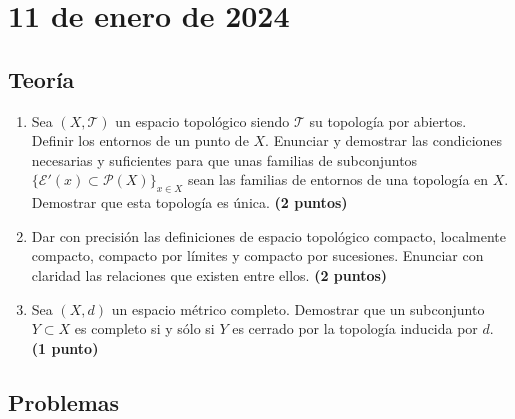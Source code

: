 \newpage

\section{11 de enero de 2024}

\subsection{Teoría}

\begin{enumerate}
    \item Sea $(X, \mathcal{T})$ un espacio topológico siendo $\mathcal{T}$ su topología por abiertos. Definir los entornos de un punto de $X$. Enunciar y demostrar las condiciones necesarias y suficientes para que unas familias de subconjuntos $\{\mathcal{E}'(x) \subset \mathcal{P}(X)\}_{x \in X}$ sean las familias de entornos de una topología en $X$. Demostrar que esta topología es única.
    \hfill \textbf{(2 puntos)}

    \item Dar con precisión las definiciones de espacio topológico compacto, localmente compacto, compacto por límites y compacto por sucesiones. Enunciar con claridad las relaciones que existen entre ellos.
    \hfill \textbf{(2 puntos)}

    \item Sea $(X, d)$ un espacio métrico completo. Demostrar que un subconjunto $Y \subset X$ es completo si y sólo si $Y$ es cerrado por la topología inducida por $d$.
    \hfill \textbf{(1 punto)}
\end{enumerate}

\subsection{Problemas}

